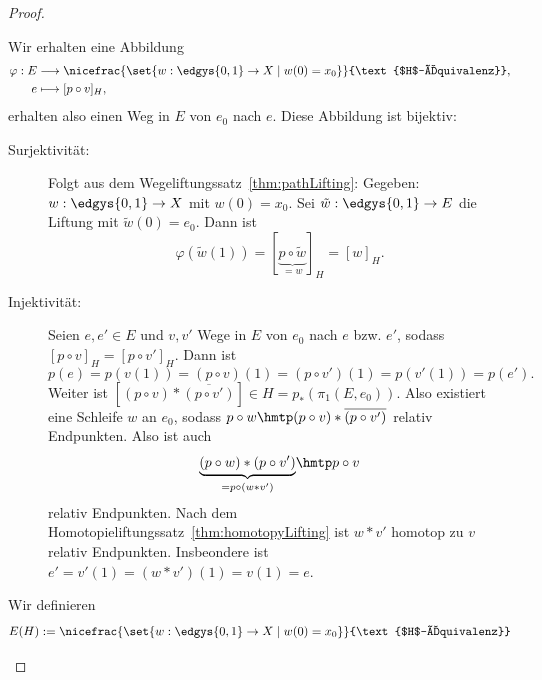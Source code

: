 \documentclass[language=ngerman]{TemplateLecture} %
\begin{document}
\begin{proof}
\begin{description}
\begin{description}
            Wir erhalten eine Abbildung 
            \begin{align*}
                \varphi: E &\longrightarrow \nicefrac{\set{w: \edgys{0,1} \to X \mid w(0) = x_0}}{\text{$H$-Äquivalenz}}, \\
                e &\longmapsto [p \circ v]_H,
            \end{align*}
            erhalten also einen Weg in $E$ von $e_0$ nach $e$. Diese Abbildung ist bijektiv:
            \begin{description}
                \item[Surjektivität:] Folgt aus dem Wegeliftungssatz~\ref{thm:pathLifting}: Gegeben: $w: \edgys{0,1} \to X$ mit $w(0) = x_0$. Sei $\tilde{w}: \edgys{0,1} \to E$ die Liftung mit $\tilde{w}(0) = e_0$. Dann ist 
                \begin{equation*}
                    \varphi(\tilde{w}(1)) = [\underset{=w}{\underbrace{p \circ \tilde{w}}}]_H = [w]_H.
                \end{equation*}
                \item[Injektivität:] Seien $e, e' \in E$ und $v, v'$ Wege in $E$ von $e_0$ nach $e$ bzw. $e'$, sodass $[p \circ v]_H = [p \circ v']_H$. Dann ist 
                \begin{equation*}
                    p(e) = p(v(1)) = (p \circ v)(1) = (p \circ v')(1) = p(v'(1)) = p(e').
                \end{equation*}
                Weiter ist $[(p \circ v) * \overline{(p \circ v')}] \in H = p_*(\pi_1(E, e_0))$. Also existiert eine Schleife $w$ an $e_0$, sodass $p \circ w \hmtp (p \circ v) * \overline{(p \circ v')}$ relativ Endpunkten. Also ist auch 
                \begin{equation*}
                    \underset{=p \circ (w * v')}{\underbrace{(p \circ w) * (p \circ v')}} \hmtp p \circ v
                \end{equation*}
                relativ Endpunkten. Nach dem Homotopieliftungssatz~\ref{thm:homotopyLifting} ist $w * v'$ homotop zu $v$ relativ Endpunkten. Insbeondere ist $e' = v'(1) = (w * v')(1) = v(1) = e$.
            \end{description}
            \item[Konstruktion der Überlagerung] Wir definieren 
            \begin{equation*}
                E(H) := \nicefrac{\set{w: \edgys{0,1} \to X \mid w(0) = x_0}}{\text{$H$-Äquivalenz}}
            \end{equation*}

\end{description}
\end{description}
\end{proof}
\end{document}
